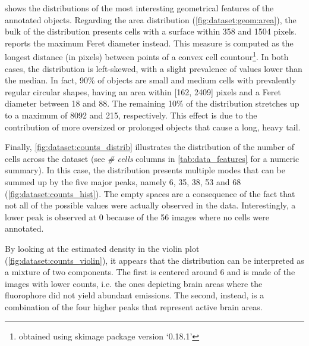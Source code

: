 shows the distributions of the most interesting geometrical features of the annotated objects.
Regarding the area distribution (\cref{fig:dataset:geom:area}), the bulk of the distribution presents cells with a surface within 358 and 1504 pixels.
 reports the maximum Feret diameter \cite{merkus2009particle} instead. This measure is computed as the longest distance (in pixels) between points of a convex cell countour\footnote{obtained using skimage package version `0.18.1'}.
In both cases, the distribution is left-skewed, with a slight prevalence of values lower than the median.
In fact, 90\% of objects are small and medium cells with prevalently regular circular shapes, having an area within [162, 2409] pixels and a Feret diameter between 18 and 88.
The remaining 10\% of the distribution stretches up to a maximum of 8092 and 215, respectively.
This effect is due to the contribution of more oversized or prolonged objects that cause a long, heavy tail.

Finally, \ref{fig:dataset:counts_distrib} illustrates the distribution of the number of cells across the dataset (see \textit{\# cells} columns in \cref{tab:data_features} for a numeric summary).
In this case, the distribution presents multiple modes that can be summed up by the five major peaks, namely 6, 35, 38, 53 and 68
(\cref{fig:dataset:counts_hist}).
The empty spaces are a consequence of the fact that not all of the possible values were actually observed in the data.
Interestingly, a lower peak is observed at 0 because of the 56 images where no cells were annotated.

By looking at the estimated density in the violin plot (\cref{fig:dataset:counts_violin}), it appears that the distribution can be interpreted as a mixture of two components.
The first is centered around 6 and is made of the images with lower counts, i.e. the ones depicting brain areas where the fluorophore did not yield abundant emissions.
The second, instead, is a combination of the four higher peaks that represent active brain areas.



